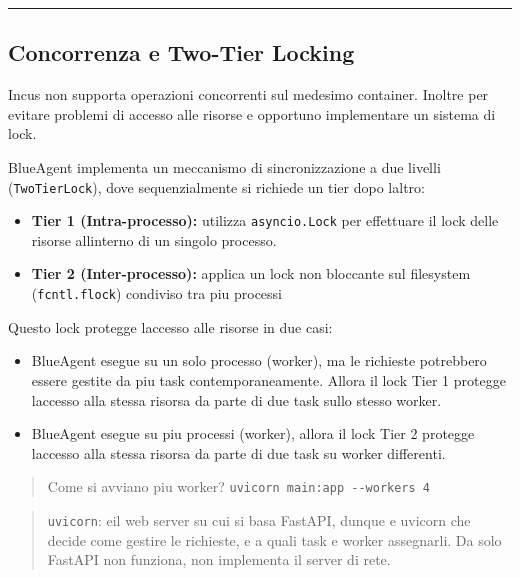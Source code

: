 \begin{center}\rule{0.5\linewidth}{0.5pt}\end{center}

\subsection{Concorrenza e Two-Tier
Locking}\label{concorrenza-e-two-tier-locking}

Incus non supporta operazioni concorrenti sul medesimo container.
Inoltre per evitare problemi di accesso alle risorse e\textquotesingle{}
opportuno implementare un sistema di lock.

BlueAgent implementa un meccanismo di sincronizzazione a due livelli
(\passthrough{\lstinline!TwoTierLock!}), dove sequenzialmente si
richiede un tier dopo l\textquotesingle altro:

\begin{itemize}
\tightlist
\item
  \textbf{Tier 1 (Intra-processo):} utilizza
  \passthrough{\lstinline!asyncio.Lock!} per effettuare il lock delle
  risorse all\textquotesingle interno di un singolo processo.
\item
  \textbf{Tier 2 (Inter-processo):} applica un lock non bloccante sul
  filesystem (\passthrough{\lstinline!fcntl.flock!}) condiviso tra piu
  processi
\end{itemize}

Questo lock protegge l\textquotesingle accesso alle risorse in due casi:

\begin{itemize}
\tightlist
\item
  BlueAgent esegue su un solo processo (worker), ma le richieste
  potrebbero essere gestite da piu task contemporaneamente. Allora il
  lock Tier 1 protegge l\textquotesingle accesso alla stessa risorsa da
  parte di due task sullo stesso worker.
\item
  BlueAgent esegue su piu processi (worker), allora il lock Tier 2
  protegge l\textquotesingle accesso alla stessa risorsa da parte di due
  task su worker differenti.
\end{itemize}

\begin{quote}
Come si avviano piu\textquotesingle{} worker?
\passthrough{\lstinline!uvicorn main:app --workers 4!}
\end{quote}

\begin{quote}
\passthrough{\lstinline!uvicorn!}: e\textquotesingle il web server su
cui si basa FastAPI, dunque e\textquotesingle{} uvicorn che decide come
gestire le richieste, e a quali task e worker assegnarli. Da solo
FastAPI non funziona, non implementa il server di rete.
\end{quote}

